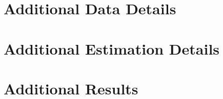 \documentclass[12pt]{article}
\theoremstyle{definition}
\theoremstyle{remark}
\begin{document}





\newpage
\appendix

\section{Additional Data Details}
\label{app:data}


\section{Additional Estimation Details}
\label{app:estimation}


\section{Additional Results}
\label{app:results}
\end{document}

